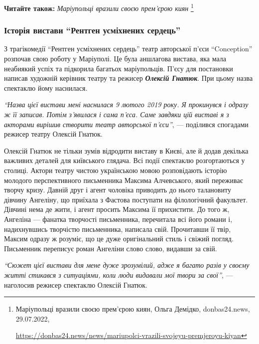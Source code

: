 \textbf{Читайте також:} \emph{Маріупольці вразили своєю прем'єрою киян}%
\footnote{Маріупольці вразили своєю прем'єрою киян, Ольга Демідко, donbas24.news, 29.07.2022, \par%
\url{https://donbas24.news/news/mariupolci-vrazili-svojeyu-premjeroyu-kiyan}%
}

\subsubsection{Історія вистави \enquote{Рентген усміхнених сердець}}

З трагікомедії \enquote{Рентген усміхнених сердець} театр авторської п'єси
\enquote{Conception} розпочав свою роботу у Маріуполі. Це була аншлагова
вистава, яка мала неабиякий успіх та підкорила багатьох маріупольців. П'єсу для
постановки написав художній керівник театру та режисер \textbf{\emph{Олексій Гнатюк}}. При
цьому назва спектаклю йому наснилася.

\begin{leftbar}
  \begingroup
\emph{\enquote{Назва цієї вистави мені наснилася 9 лютого 2019 року. Я прокинувся і
одразу ж її записав. Потім з'явилася і сама п'єса. Саме завдяки цій
виставі я з акторами вирішив створити театр авторської п'єси}}, —
поділився спогадами режисер театру Олексій Гнатюк. 
  \endgroup
\end{leftbar}


Олексій Гнатюк не тільки зумів відродити виставу в Києві, але й додав декілька
важливих деталей для київського глядача. Всі події спектаклю розгортаються у
столиці. Актори театру чистою українською мовою розповідають історію молодого
перспективного письменника Максима Алчевського, який переживає творчу кризу.
Давній друг і агент чоловіка приводить до нього талановиту дівчину Ангеліну, що
приїхала з Фастова поступати на філологічний факультет. Дівчині нема де жити, і
агент просить Максима її прихистити. До того ж, Ангеліна — фанатка творчості
письменника, перечитала всі його романи і, надихнувшись творчістю письменника,
написала свій. Прочитавши її твір, Максим одразу ж розуміє, що це дуже
оригінальний стиль і свіжий погляд. Письменник переписує роман Ангеліни слово
слово, видавши за свій.

\begin{leftbar}
  \begingroup
\emph{\enquote{Сюжет цієї вистави для мене дуже зрозумілий, адже я багато разів у своєму
житті стикався з ситуаціями, коли люди видавали мої твори за свої}}, —
наголосив режисер спектаклю Олексій Гнатюк. 
  \endgroup
\end{leftbar}

